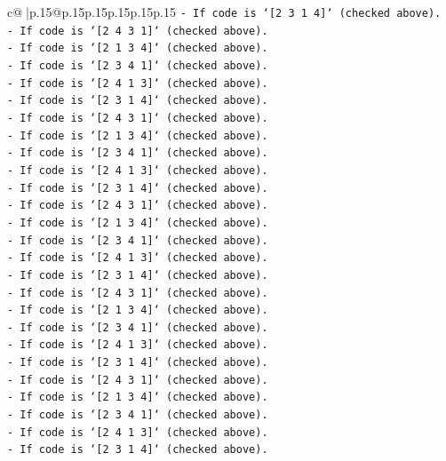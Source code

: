 \documentclass{article}
\begin{document}
{\begin{supertabular}{c@{$\;$}|p{.15\linewidth}@{}p{.15\linewidth}p{.15\linewidth}p{.15\linewidth}p{.15\linewidth}p{.15\linewidth}}
{{{\texttt{{-} If code is `{[}2 3 1 4{]}` (checked above).} \\
\texttt{{-} If code is `{[}2 4 3 1{]}` (checked above).} \\
\texttt{{-} If code is `{[}2 1 3 4{]}` (checked above).} \\
\texttt{{-} If code is `{[}2 3 4 1{]}` (checked above).} \\
\texttt{{-} If code is `{[}2 4 1 3{]}` (checked above).} \\
\texttt{{-} If code is `{[}2 3 1 4{]}` (checked above).} \\
\texttt{{-} If code is `{[}2 4 3 1{]}` (checked above).} \\
\texttt{{-} If code is `{[}2 1 3 4{]}` (checked above).} \\
\texttt{{-} If code is `{[}2 3 4 1{]}` (checked above).} \\
\texttt{{-} If code is `{[}2 4 1 3{]}` (checked above).} \\
\texttt{{-} If code is `{[}2 3 1 4{]}` (checked above).} \\
\texttt{{-} If code is `{[}2 4 3 1{]}` (checked above).} \\
\texttt{{-} If code is `{[}2 1 3 4{]}` (checked above).} \\
\texttt{{-} If code is `{[}2 3 4 1{]}` (checked above).} \\
\texttt{{-} If code is `{[}2 4 1 3{]}` (checked above).} \\
\texttt{{-} If code is `{[}2 3 1 4{]}` (checked above).} \\
\texttt{{-} If code is `{[}2 4 3 1{]}` (checked above).} \\
\texttt{{-} If code is `{[}2 1 3 4{]}` (checked above).} \\
\texttt{{-} If code is `{[}2 3 4 1{]}` (checked above).} \\
\texttt{{-} If code is `{[}2 4 1 3{]}` (checked above).} \\
\texttt{{-} If code is `{[}2 3 1 4{]}` (checked above).} \\
\texttt{{-} If code is `{[}2 4 3 1{]}` (checked above).} \\
\texttt{{-} If code is `{[}2 1 3 4{]}` (checked above).} \\
\texttt{{-} If code is `{[}2 3 4 1{]}` (checked above).} \\
\texttt{{-} If code is `{[}2 4 1 3{]}` (checked above).} \\
\texttt{{-} If code is `{[}2 3 1 4{]}` (checked above).} \\
}}}
\end{supertabular}}
\end{document}
